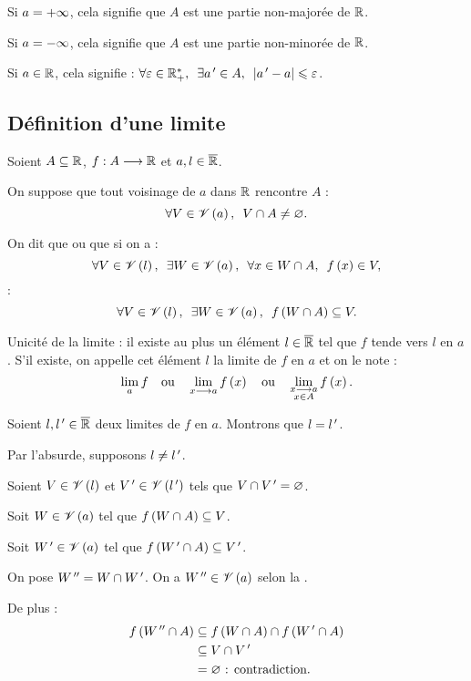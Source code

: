 Si \(a=+\infty\), cela signifie que \(A\) est une partie non-majorée de \(\mathbb{R}\).

Si \(a=-\infty\), cela signifie que \(A\) est une partie non-minorée de \(\mathbb{R}\).

Si \(a\in\mathbb{R}\), cela signifie : \(\quantifs{\forall\epsilon\in\Rps;\exists a\prim\in A}\abs{a\prim-a}\leq\epsilon\).

\subsection{Définition d'une limite}

\begin{defprop}
Soient \(A\subseteq\mathbb{R}\), \(f:A\longrightarrow\mathbb{R}\) et \(a,l\in\overline{\mathbb{R}}\).

On suppose que tout voisinage de \(a\) dans \(\mathbb{R}\) rencontre \(A\) : \[\quantifs{\forall V\in\V{a}}V\inter A\not=\ensvide.\]

On dit que  ou que  si on a : \[\quantifs{\forall V\in\V{l};\exists W\in\V{a};\forall x\in W\inter A}f\paren{x}\in V,\] \cad : \[\quantifs{\forall V\in\V{l};\exists W\in\V{a}}f\paren{W\inter A}\subset V.\]

Unicité de la limite : il existe au plus un élément \(l\in\overline{\mathbb{R}}\) tel que \(f\) tende vers \(l\) en \(a\). S'il existe, on appelle cet élément \(l\) la limite de \(f\) en \(a\) et on le note : \[\lim_af\quad\text{ou}\quad\lim_{x\longrightarrow a}f\left(x\right)\quad\text{ou}\quad\lim_{\substack{x\longrightarrow a \\ x\in A}}f\left(x\right).\]
\end{defprop}

\begin{dem}
Soient \(l,l^{\,\prime}\in\overline{\mathbb{R}}\) deux limites de \(f\) en \(a\). Montrons que \(l=l^{\,\prime}\).

Par l'absurde, supposons \(l\not=l^{\,\prime}\).

Soient \(V\in\mathscr{V}\left(l\right)\) et \(V^{\,\prime}\in\mathscr{V}\left(l^{\,\prime}\right)\) tels que \(V\cap V^{\,\prime}=\varnothing\).

Soit \(W\in\mathscr{V}\left(a\right)\) tel que \(f\left(W\cap A\right)\subseteq V\).

Soit \(W^{\,\prime}\in\mathscr{V}\left(a\right)\) tel que \(f\left(W^{\,\prime}\cap A\right)\subseteq V^{\,\prime}\).

On pose \(W^{\,\prime\prime}=W\cap W^{\,\prime}\). On a \(W^{\,\prime\prime}\in\mathscr{V}\left(a\right)\) selon la .

De plus : \[\begin{aligned}
f\left(W^{\,\prime\prime}\cap A\right)&\subseteq f\left(W\cap A\right)\cap f\left(W^{\,\prime}\cap A\right) \\
&\subseteq V\cap V^{\,\prime} \\
&=\varnothing\text{ : contradiction.}
\end{aligned}\]
\end{dem}

